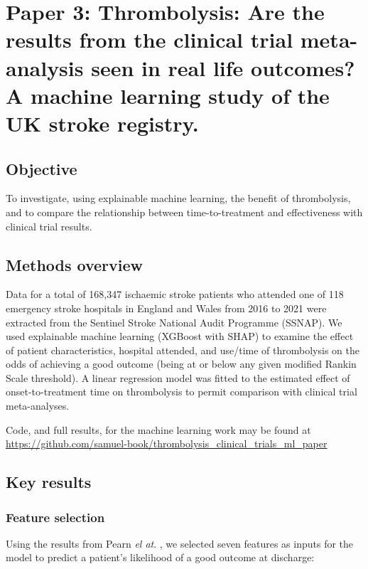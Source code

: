 \section{Paper 3: Thrombolysis: Are the results from the clinical trial meta-analysis seen in real life outcomes?  A machine learning study of the UK stroke registry.\cite{pearn_are_2024}}\label{sec:paper_3}

\subsection{Objective}

To investigate, using explainable machine learning, the benefit of thrombolysis, and to compare the relationship between time-to-treatment and effectiveness with clinical trial results.

\subsection{Methods overview}

Data for a total of 168,347 ischaemic stroke patients who attended one of 118 emergency stroke hospitals in England and Wales from 2016 to 2021 were extracted from the Sentinel Stroke National Audit Programme (SSNAP). We used explainable machine learning (XGBoost\cite{chen_xgboost_2016} with SHAP\cite{lundberg_unified_2017}) to examine the effect of patient characteristics, hospital attended, and use/time of thrombolysis on the odds of achieving a good outcome (being at or below any given modified Rankin Scale threshold). A linear regression model was fitted to the estimated effect of onset-to-treatment time on thrombolysis to permit comparison with clinical trial meta-analyses.

Code, and full results, for the machine learning work may be found at \url{https://github.com/samuel-book/thrombolysis_clinical_trials_ml_paper}

\subsection{Key results}

\subsubsection{Feature selection}

Using the results from Pearn \textit{el at}. \cite{pearn_are_2024}, we selected seven features as inputs for the model to predict a patient's likelihood of a good outcome at discharge:


